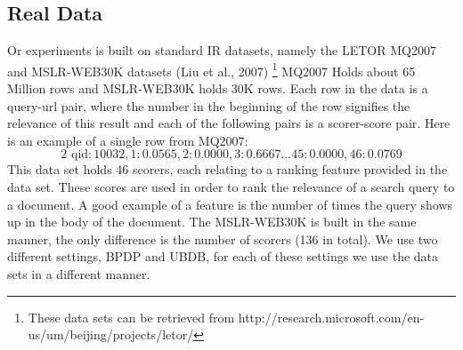 \documentclass{llncs}
\begin{document}
\subsection{Real Data} 
Or experiments is built on standard IR datasets, namely the LETOR MQ2007 and MSLR-WEB30K datasets (Liu et al., 2007) \footnote{These data sets can be retrieved from http://research.microsoft.com/en-us/um/beijing/projects/letor/}
MQ2007 Holds about 65 Million rows and MSLR-WEB30K holds 30K rows.
Each row in the data is a query-url pair, where the number in the beginning of the row signifies the relevance of this result and each of the following pairs is a scorer-score pair.
Here is an example of a single row from MQ2007:  
\begin{equation}\label{queri}
2 \text{ qid}:10032, 1:0.0565, 2:0.0000, 3:0.6667 ... 45:0.0000, 46:0.0769
\end{equation}
This data set holds 46 scorers, each relating to a ranking feature provided in the data set. 
These scores are used in order to rank the relevance of a search query to a document. A good example of a feature is the number of times the query shows up in the body of the document. 
The MSLR-WEB30K is built in the same manner, the only difference is the number of scorers (136 in total).
We use two different settings,  BPDP and UBDB, for each of these settings we use the data sets in a different manner.
\end{document}
